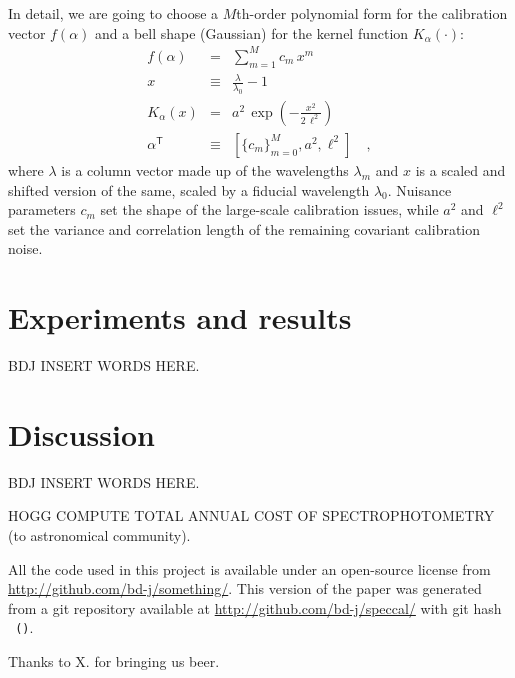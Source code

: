 \documentclass[iop,numberedappendix]{emulateapj}
\newcommand{\transpose}[1]{{#1}^{\!\mathsf T}}
\begin{document}
In detail, we are going to choose a $M$th-order polynomial form for
the calibration vector $f(\alpha)$ and a bell shape (Gaussian) for the
kernel function $K_\alpha(\cdot)$:
\begin{eqnarray}
f(\alpha) &=& \sum_{m=1}^M c_m\,x^m
\\
x &\equiv& \frac{\lambda}{\lambda_0} - 1
\\
K_\alpha(x) &=& a^2\,\exp(-\frac{x^2}{2\,\ell^2})
\\
\transpose{\alpha} &\equiv& \left[ \{c_m\}_{m=0}^M, a^2, \ell^2 \right]
\quad ,
\end{eqnarray}
where $\lambda$ is a column vector made up of the wavelengths $\lambda_m$
and $x$ is a scaled and shifted version of the same,
scaled by a fiducial wavelength $\lambda_0$.
Nuisance parameters $c_m$ set the shape of the large-scale calibration
issues, while $a^2$ and $\ell^2$ set the variance and correlation
length of the remaining covariant calibration noise.

\section{Experiments and results}

BDJ INSERT WORDS HERE.

\section{Discussion}

BDJ INSERT WORDS HERE.

HOGG COMPUTE TOTAL ANNUAL COST OF SPECTROPHOTOMETRY (to astronomical community).

All the code used in this project is available under an open-source license
  from \url{http://github.com/bd-j/something/}.
This version of the paper was generated
  from a git repository available at \url{http://github.com/bd-j/speccal/}
  with git hash \texttt{\githash\,(\gitdate)}.

\acknowledgements
Thanks to X. for bringing us beer.
\end{document}
